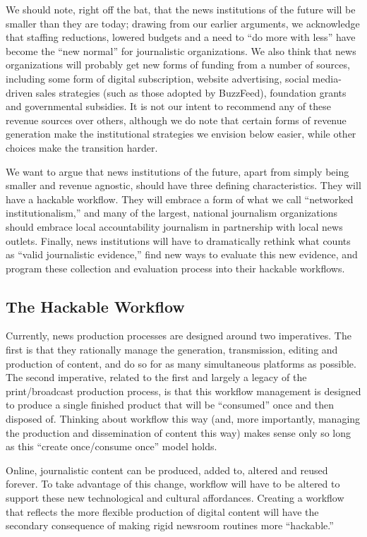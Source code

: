 We should note, right off the bat, that the news institutions of the future will be
smaller than they are today; drawing from our earlier arguments, we acknowledge
that staffing reductions, lowered budgets and a need to ``do more with less''
have become the ``new normal'' for journalistic organizations. We also think that
news organizations will probably get new forms of funding from a number of
sources, including some form of digital subscription, website advertising, social
media-driven sales strategies (such as those adopted by BuzzFeed), foundation
grants and governmental subsidies. It is not our intent to recommend any of
these revenue sources over others, although we do note that certain forms of revenue
generation make the institutional strategies we envision below easier, while
other choices make the transition harder.

We want to argue that news institutions of the future, apart from simply being
smaller and revenue agnostic, should have three defining characteristics. They will
have a hackable workflow. They will embrace a form of what we call ``networked
institutionalism,'' and many of the largest, national journalism organizations
should embrace local accountability journalism in partnership with local news
outlets. Finally, news institutions will have to dramatically rethink what counts as
``valid journalistic evidence,'' find new ways to evaluate this new evidence, and
program these collection and evaluation process into their hackable workflows.

\subsection{The Hackable Workflow}
Currently, news production processes are designed around two imperatives. The
first is that they rationally manage the generation, transmission, editing and production
of content, and do so for as many simultaneous platforms as possible. The
second imperative, related to the first and largely a legacy of the print/broadcast production process, is that this workflow management is designed to produce
a single finished product that will be ``consumed'' once and then disposed of.
Thinking about workflow this way (and, more importantly, managing the production
and dissemination of content this way) makes sense only so long as this
``create once/consume once'' model holds.

Online, journalistic content can be produced, added to, altered and reused forever.
To take advantage of this change, workflow will have to be altered to support
these new technological and cultural affordances. Creating a workflow that
reflects the more flexible production of digital content will have the secondary
consequence of making rigid newsroom routines more ``hackable.''

